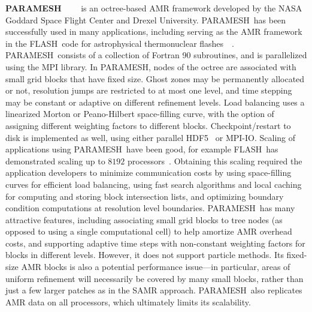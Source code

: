 \documentclass[11pt,letterpaper]{article}
\newcommand{\paramesh}{\textsf{PARAMESH}}
\newcommand{\flash}{\textsf{FLASH}}
\begin{document}
\textbf{\paramesh}~\cite{MaOl00}~\cite{OlMa05}~\cite{Ol06}~\cite{wwwparamesh}
is an octree-based AMR framework developed by the NASA Goddard Space
Flight Center and Drexel University.  \paramesh\ has been successfully
used in many applications, including serving as the AMR framework in
the \flash\ code for astrophysical thermonuclear
flashes~\cite{FrOl00}~\cite{wwwflash}.  \paramesh\ consists of a
collection of Fortran 90 subroutines, and is parallelized using the
MPI library.
%
In \paramesh, nodes of the octree are associated with small grid
blocks that have fixed size.  Ghost zones may be permanently
allocated or not, resolution jumps are restricted to at most one
level, and time stepping may be constant or adaptive on different
refinement levels.  Load balancing uses a linearized Morton or
Peano-Hilbert space-filling curve, with the option of assigning
different weighting factors to different blocks.  Checkpoint/restart
to disk is implemented as well, using either parallel HDF5~\cite{hdf5}
or MPI-IO.
%
Scaling of applications using \paramesh\ have been good, for example
\flash\ has demonstrated scaling up to $8192$
processors~\cite{CoBe07}.  Obtaining this scaling required the
application developers to minimize communication costs by using
space-filling curves for efficient load balancing, using fast search
algorithms and local caching for computing and storing block
intersection lists, and optimizing boundary condition computations at
resolution level boundaries.
%
\paramesh\ has many attractive features, including associating small
grid blocks to tree nodes (as opposed to using a single computational
cell) to help amortize AMR overhead costs, and supporting adaptive
time steps with non-constant weighting factors for blocks in different
levels.  However, it does not support particle methods.  Its
fixed-size AMR blocks is also a potential performance issue---in
particular, areas of uniform refinement will necessarily be covered by
many small blocks, rather than just a few larger patches as in the
SAMR approach.  \paramesh\ also replicates AMR data on all processors, which
ultimately limits its scalability.

\end{document}
